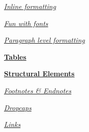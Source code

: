 \documentclass[\officeparserdriver 12pt]{article}
\begin{document}
{\leftskip=12bp \hspace*{21.6bp}\hyperref[_Toc2137712100]{\textcolor{hex0000FF}{\uline{\textit{{\fontsize{10pt}{12pt}\selectfont Inline formatting}}}} \textcolor{hex0000FF}{\uline{\textit{{\fontsize{10pt}{12pt}}}}}}\par}

{\leftskip=12bp \hspace*{21.6bp}\hyperref[_Toc1074133965]{\textcolor{hex0000FF}{\uline{\textit{{\fontsize{10pt}{12pt}\selectfont Fun with fonts}}}} \textcolor{hex0000FF}{\uline{\textit{{\fontsize{10pt}{12pt}}}}}}\par}

{\leftskip=12bp \hspace*{21.6bp}\hyperref[_Toc2022725662]{\textcolor{hex0000FF}{\uline{\textit{{\fontsize{10pt}{12pt}\selectfont Paragraph level formatting}}}} \textcolor{hex0000FF}{\uline{\textit{{\fontsize{10pt}{12pt}}}}}}\par}

{\hspace*{21.6bp}\hyperref[_Toc28114276]{\textcolor{hex0000FF}{\uline{\textbf{{\fontsize{10pt}{12pt}\selectfont Tables}}}} \textcolor{hex0000FF}{\uline{\textbf{{\fontsize{10pt}{12pt}}}}}}\par}

{\hspace*{21.6bp}\hyperref[_Toc54889875]{\textcolor{hex0000FF}{\uline{\textbf{{\fontsize{10pt}{12pt}\selectfont Structural Elements}}}} \textcolor{hex0000FF}{\uline{\textbf{{\fontsize{10pt}{12pt}}}}}}\par}

{\leftskip=12bp \hspace*{21.6bp}\hyperref[_Toc201580556]{\textcolor{hex0000FF}{\uline{\textit{{\fontsize{10pt}{12pt}\selectfont Footnotes \& Endnotes}}}} \textcolor{hex0000FF}{\uline{\textit{{\fontsize{10pt}{12pt}}}}}}\par}

{\leftskip=12bp \hspace*{21.6bp}\hyperref[_Toc1977424358]{\textcolor{hex0000FF}{\uline{\textit{{\fontsize{10pt}{12pt}\selectfont Dropcaps}}}} \textcolor{hex0000FF}{\uline{\textit{{\fontsize{10pt}{12pt}}}}}}\par}

{\leftskip=12bp \hspace*{21.6bp}\hyperref[_Toc1233048813]{\textcolor{hex0000FF}{\uline{\textit{{\fontsize{10pt}{12pt}\selectfont Links}}}} \textcolor{hex0000FF}{\uline{\textit{{\fontsize{10pt}{12pt}}}}}}\par}
\end{document}
